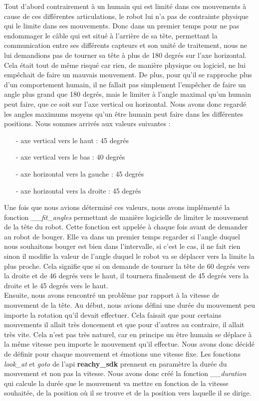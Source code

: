 \documentclass[a4paper,french]{article}
\begin{document}
Tout d'abord contrairement à un humain qui est limité dans ces mouvements à cause de ces différentes articulations, le robot lui n'a pas de contrainte physique qui le limite dans ses mouvements. Donc dans un premier temps pour ne pas endommager le câble qui est situé à l'arrière de sa tête, permettant la communication entre ses différents capteurs et son unité de traitement, nous ne lui demandions pas de tourner sa tête à plus de 180 degrés sur l'axe horizontal. Cela était tout de même risqué car rien, de manière physique ou logiciel, ne lui empêchait de faire un mauvais mouvement. De plus, pour qu'il se rapproche plus d'un comportement humain, il ne fallait pas simplement l'empêcher de faire un angle plus grand que 180 degrés, mais le limiter à l'angle maximal qu'un humain peut faire, que ce soit sur l'axe vertical ou horizontal. Nous avons donc regardé les angles maximums moyens qu'un être humain peut faire dans les différentes positions. Nous sommes arrivés aux valeurs suivantes :
\begin{itemize}
    \item[-] axe vertical vers le haut : 45 degrés
    \item[-] axe vertical vers le bas : 40 degrés
    \item[-] axe horizontal vers la gauche : 45 degrés
    \item[-] axe horizontal vers la droite : 45 degrés
\end{itemize}
Une fois que nous avions déterminé ces valeurs, nous avons implémenté la fonction \textit{\_\_fit\_angles} permettant de manière logicielle de limiter le mouvement de la tête du robot. Cette fonction est appelée à chaque fois avant de demander au robot de bouger. Elle va dans un premier temps regarder si l'angle duquel nous souhaitons bouger est bien dans l'intervalle, si c'est le cas, il ne fait rien sinon il modifie la valeur de l'angle duquel le robot va se déplacer vers la limite la plus proche. Cela signifie que si on demande de tourner la tête de 60 degrés vers la droite et de 46 degrés vers le haut, il tournera finalement de 45 degrés vers la droite et le 45 degrés vers le haut.\\

Ensuite, nous avons rencontré un problème par rapport à la vitesse de mouvement de la tête. Au début, nous avions défini une durée du mouvement peu importe la rotation qu'il devait effectuer. Cela faisait que pour certains mouvements il allait très doucement et que pour d'autres au contraire, il allait très vite. Cela n'est pas très naturel, car en principe un être humain se déplace à la même vitesse peu importe le mouvement qu'il effectue. Nous avons donc décidé de définir pour chaque mouvement et émotions une vitesse fixe. Les fonctions \textit{look\_at} et \textit{goto} de l'api \textbf{reachy\_sdk} prennent en paramètre la durée du mouvement et non pas la vitesse. Nous avons donc créé la fonction \textit{\_\_duration} qui calcule la durée que le mouvement va mettre en fonction de la vitesse souhaitée, de la position où il se trouve et de la position vers laquelle il se dirige. \\
\end{document}
